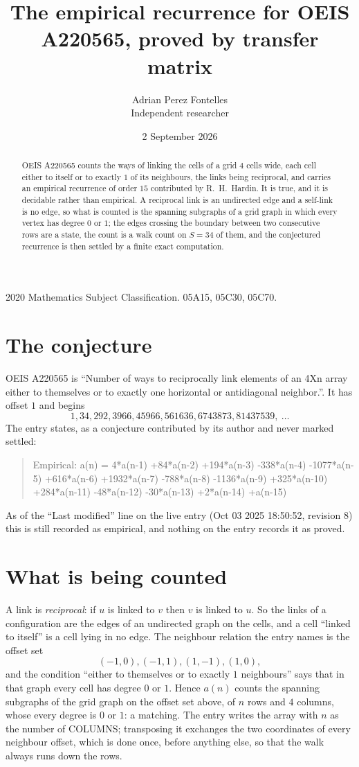 \documentclass[11pt,a4paper]{article}
\title{The empirical recurrence for OEIS A220565, proved by transfer matrix}
\author{Adrian Perez Fontelles\\ \small Independent researcher}
\date{2 September 2026}
\theoremstyle{plain}
\theoremstyle{definition}
\begin{document}
\maketitle

\begin{abstract}
OEIS A220565 counts the ways of linking the cells of a grid $4$ cells wide, each cell either to
itself or to exactly $1$ of its neighbours, the links being reciprocal, and carries an
empirical recurrence of order $15$ contributed by R.~H.~Hardin. It is true, and it is
decidable rather than empirical. A reciprocal link is an undirected edge and a self-link is
no edge, so what is counted is the spanning subgraphs of a grid graph in which every vertex
has degree $0$ or $1$; the edges crossing the boundary between two consecutive rows are a
state, the count is a walk count on $S=34$ of them, and the conjectured recurrence is then
settled by a finite exact computation.
\end{abstract}

\noindent\small 2020 Mathematics Subject Classification. 05A15, 05C30, 05C70.\normalsize

\section{The conjecture}

OEIS A220565 is ``Number of ways to reciprocally link elements of an 4Xn array either to themselves or to exactly one horizontal or antidiagonal neighbor.''. It has offset $1$ and begins
\[
1, 34, 292, 3966, 45966, 561636, 6743873, 81437539,\ \dots
\]
The entry states, as a conjecture contributed by its author and never marked settled:
\begin{quote}
Empirical: a(n) = 4*a(n-1) +84*a(n-2) +194*a(n-3) -338*a(n-4) -1077*a(n-5) +616*a(n-6) +1932*a(n-7) -788*a(n-8) -1136*a(n-9) +325*a(n-10) +284*a(n-11) -48*a(n-12) -30*a(n-13) +2*a(n-14) +a(n-15)
\end{quote}
As of the ``Last modified'' line on the live entry (Oct 03 2025 18:50:52, revision 8) this is still
recorded as empirical, and nothing on the entry records it as proved.

\section{What is being counted}

A link is \emph{reciprocal}: if $u$ is linked to $v$ then $v$ is linked to $u$. So the links
of a configuration are the edges of an undirected graph on the cells, and a cell ``linked to
itself'' is a cell lying in no edge. The neighbour relation the entry names is the offset set
\[
(-1,0), (-1,1), (1,-1), (1,0),
\]
and the condition ``either to themselves or to exactly $1$ neighbours'' says that in that
graph every cell has degree $0$ or $1$. Hence $a(n)$ counts the spanning subgraphs of the
grid graph on the offset set above, of $n$ rows and $4$ columns,
whose every degree is $0$ or $1$: a matching. The entry writes the array with $n$ as the number of COLUMNS; transposing it exchanges the two coordinates of every neighbour offset, which is done once, before anything else, so that the walk always runs down the rows.
\end{document}
